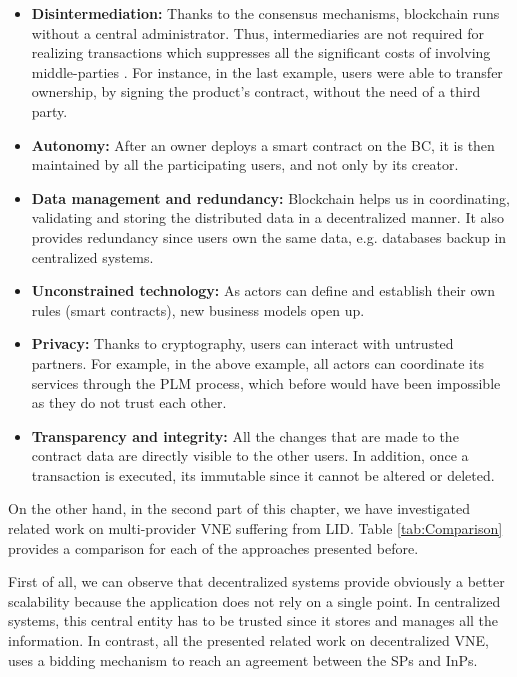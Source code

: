 \begin{itemize}
	\item \textbf{Disintermediation:} Thanks to the consensus mechanisms, blockchain runs without a central administrator. Thus, intermediaries are not required for realizing transactions which suppresses all the significant costs of involving middle-parties \citep{mainelli2015sharing}. For instance, in the last example, users were able to transfer ownership, by signing the product's contract, without the need of a third party.
	\item \textbf{Autonomy:} After an owner deploys a smart contract on the BC, it is then maintained by all the participating users, and not only by its creator.
	\item \textbf{Data management and redundancy:} Blockchain helps us in coordinating, validating and storing the distributed data in a decentralized manner. It also provides redundancy since users own the same data, e.g. databases backup in centralized systems. 
	\item \textbf{Unconstrained technology:} As actors can define and establish their own rules (smart contracts), new business models open up.
	\item \textbf{Privacy:} Thanks to cryptography, users can interact with untrusted partners. For example, in the above example, all actors can coordinate its services through the PLM process, which before would have been impossible as they do not trust each other.
    \item \textbf{Transparency and integrity:} All the changes that are made to the contract data are directly visible to the other users. In addition, once a transaction is executed, its immutable since it cannot be altered or deleted.
	
\end{itemize}

On the other hand, in the second part of this chapter, we have investigated related work on multi-provider VNE suffering from LID. Table \ref{tab:Comparison} provides a comparison for each of the approaches presented before. 

First of all, we can observe that decentralized systems provide obviously a better scalability because the application does not rely on a single point. In centralized systems, this central entity has to be trusted since it stores and manages all the information. In contrast, all the presented related work on decentralized VNE, uses a bidding mechanism to reach an agreement between the SPs and InPs.

